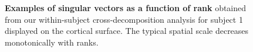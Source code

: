\documentclass[10pt]{article}
\begin{document}
\begin{figure}[H]


\caption{\label{fig-singular-vectors}\textbf{Examples of singular
vectors as a function of rank} obtained from our within-subject
cross-decomposition analysis for subject 1 displayed on the cortical
surface. The typical spatial scale decreases monotonically with ranks.}

\end{figure}%
\end{document}
